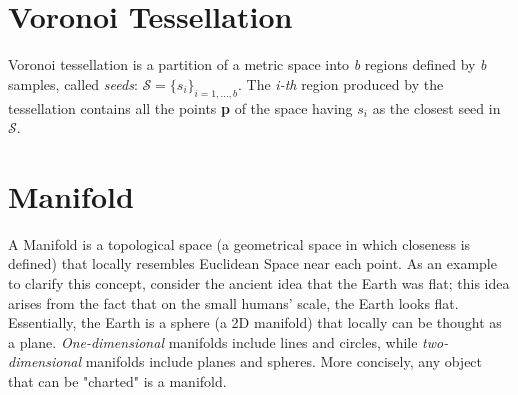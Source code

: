 \section{Voronoi Tessellation}
\label{sec:voronoi}
Voronoi tessellation is a partition of a metric space into \textit{b} regions defined by \textit{b} samples, called \textit{seeds}: $\mathcal{S} = \{s_i\}_{i=1,...,b}$. The \textit{i-th} region produced by the tessellation contains all the points \textbf{p} of the space having $s_i$ as the closest seed in $\mathcal{S}$. \newline


\section{Manifold}
\label{sec:manifold}
A Manifold \cite{manifold} is a topological space (a geometrical space in which closeness is defined) that locally resembles Euclidean Space near each point. As an example to clarify this concept, consider the ancient idea that the Earth was flat; this idea arises from the fact that on the small humans' scale, the Earth looks flat.
\newline
Essentially, the Earth is a sphere (a 2D manifold) that locally can be thought as a plane. \textit{One-dimensional} manifolds include lines and circles, while \textit{two-dimensional} manifolds include planes and spheres. More concisely, any object that can be "charted" is a manifold. 

